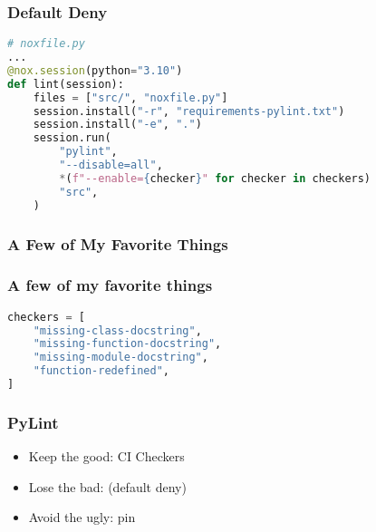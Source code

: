 \begin{frame}[fragile]
\frametitle{Default Deny}

\begin{lstlisting}[language=Python]
# noxfile.py
...
@nox.session(python="3.10")
def lint(session):
    files = ["src/", "noxfile.py"]
    session.install("-r", "requirements-pylint.txt")
    session.install("-e", ".")
    session.run(
        "pylint",
        "--disable=all",
        *(f"--enable={checker}" for checker in checkers)
        "src",
    )
\end{lstlisting}

\end{frame}

\hypertarget{a-few-of-my-favorite-things}{%
\subsubsection{A Few of My Favorite
Things}\label{a-few-of-my-favorite-things}}

\begin{frame}[fragile]
\frametitle{A few of my favorite things}

\begin{lstlisting}[language=Python]
checkers = [
    "missing-class-docstring",
    "missing-function-docstring",
    "missing-module-docstring",
    "function-redefined",
]
\end{lstlisting}

\end{frame}



\begin{frame}
\frametitle{PyLint}

\begin{itemize}
\item Keep the good: \pause
      CI \pause
      Checkers \pause
\item Lose the bad:
      \pause (default deny)
      \pause
\item Avoid the ugly: \pause
      pin
\end{itemize}

\end{frame}
